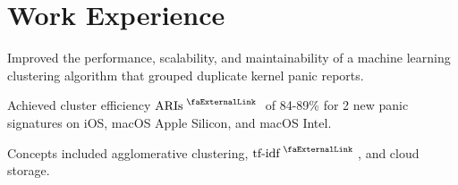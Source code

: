 \documentclass[]{deedy-resume-openfont}
\begin{document}
\begin{minipage}[t]{0.33\textwidth}


%
%

\end{minipage} 
\hfill
\begin{minipage}[t]{0.66\textwidth} 




\section{Work Experience}
\sectionsep

\vspace{\topsep} %
\begin{tightemize}
    \item Improved the performance, scalability, and maintainability of a machine learning clustering algorithm that grouped duplicate kernel panic reports.
    \item Achieved cluster efficiency \href{https://en.wikipedia.org/wiki/Rand_index#:~:text=(true\%20negatives).-,Adjusted\%20Rand\%20index,specified\%20by\%20a\%20random\%20model.}{$\link{ARIs}$} of 84-89\% for 2 new panic signatures on iOS, macOS Apple Silicon, and macOS Intel.
    \item Concepts included agglomerative clustering, \href{https://en.wikipedia.org/wiki/Tf\%E2\%80\%93idf#:~:text=In\%20information\%20retrieval\%2C\%20tf\%E2\%80\%93idf,in\%20a\%20collection\%20or\%20corpus.}{$\link{tf-idf}$}, and cloud storage.
\end{tightemize}
\sectionsep


\end{minipage}
\end{document}
